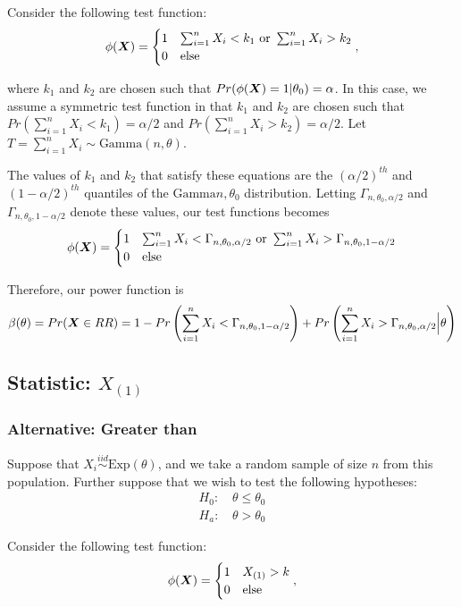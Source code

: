 \documentclass[]{article}
\newcommand{\bfX}{\mbox{\boldmath $X$}}
\begin{document}
Consider the following test function:
\[
\phi(\bfX) = \begin{cases}
1 & \sum_{i=1}^n X_i < k_1 \text{ or } \sum_{i=1}^n X_i > k_2 \\
0 & \text{else}
\end{cases},
\]

where $k_1$ and $k_2$ are chosen such that $Pr(\phi(\bfX) = 1|\theta_0) = \alpha$. In this case, we assume a symmetric test function in that $k_1$ and $k_2$ are chosen such that $Pr(\sum_{i=1}^n X_i < k_1) = \alpha/2$ and $Pr(\sum_{i=1}^n X_i > k_2) = \alpha/2$. Let $T = \sum_{i=1}^n X_i \sim \text{Gamma}(n, \theta)$. 

The values of $k_1$ and $k_2$ that satisfy these equations are the $(\alpha/2)^{th}$ and $(1 - \alpha/2)^{th}$ quantiles of the $\text{Gamma}{n, \theta_0}$ distribution. Letting $\Gamma_{n, \theta_0, \alpha/2}$ and $\Gamma_{n, \theta_0, 1- \alpha/2}$ denote these values, our test functions becomes
\[
\phi(\bfX) = \begin{cases}
1 & \sum_{i=1}^n X_i < \Gamma_{n, \theta_0, \alpha/2} \text{ or } \sum_{i=1}^n X_i > \Gamma_{n, \theta_0, 1 - \alpha/2}\\
0 & \text{else}
\end{cases}
\]

Therefore, our power function is
\[
\beta(\theta) = Pr(\bfX \in RR) = 1 - Pr\left(\sum_{i=1}^n X_i < \Gamma_{n, \theta_0, 1 - \alpha/2}\right) +  Pr\left(\sum_{i=1}^n X_i > \Gamma_{n, \theta_0, \alpha/2} \Big| \theta\right) 
\]

\subsection{Statistic: $X_{(1)}$}

\subsubsection{Alternative: Greater than}

Suppose that $X_i \stackrel{iid}{\sim} \text{Exp}(\theta)$, and we take a random sample of size $n$ from this population. Further suppose that we wish to test the following hypotheses:
\[
\begin{split}
\text{$H_0$: }& \theta \leq \theta_0 \\
\text{$H_a$: }& \theta > \theta_0
\end{split}
\]

Consider the following test function:
\[
\phi(\bfX) = \begin{cases}
1 & X_{(1)} > k \\
0 & \text{else}
\end{cases},
\]
\end{document}
